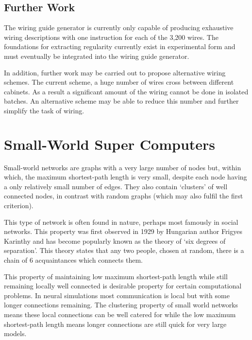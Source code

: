 		\subsection{Further Work}
			
			
			The wiring guide generator is currently only capable of producing
			exhaustive wiring descriptions with one instruction for each of the 3,200
			wires. The foundations for extracting regularity currently exist in
			experimental form and must eventually be integrated into the wiring guide
			generator.
			
			In addition, further work may be carried out to propose alternative wiring
			schemes. The current scheme, a huge number of wires cross between
			different cabinets. As a result a significant amount of the wiring cannot
			be done in isolated batches. An alternative scheme may be able to reduce
			this number and further simplify the task of wiring.
	
	\section{Small-World Super Computers}
		
		\label{sec:small-world-super-computers}
		
		
		Small-world networks are graphs with a very large number of nodes but,
		within which, the maximum shortest-path length is very small, despite each
		node having a only relatively small number of edges. They also contain
		`clusters' of well connected nodes, in contrast with random graphs (which
		may also fulfil the first criterion).
		
		This type of network is often found in nature, perhaps most famously in
		social networks. This property was first observed in 1929 by Hungarian
		author Frigyes Karinthy\cite{karinthy29} and has become popularly known as
		the theory of `six degrees of separation'. This theory states that any two
		people, chosen at random, there is a chain of 6 acquaintances which connects
		them.
		
		This property of maintaining low maximum shortest-path length while still
		remaining locally well connected is desirable property for certain
		computational problems. In neural simulations most communication is local
		but with some longer connections remaining. The clustering property of small
		world networks means these local connections can be well catered for while
		the low maximum shortest-path length means longer connections are still
		quick for very large models.
		
